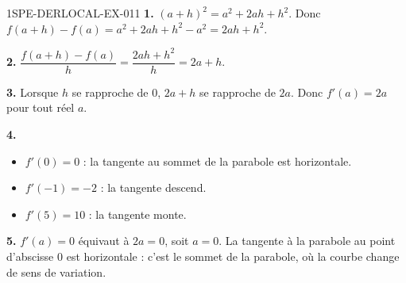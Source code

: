 \begin{corrige}{1SPE-DERLOCAL-EX-011}
\textbf{1.} $(a+h)^2=a^2+2ah+h^2$. Donc $f(a+h)-f(a)=a^2+2ah+h^2-a^2=2ah+h^2$.

\textbf{2.} $\dfrac{f(a+h)-f(a)}{h}=\dfrac{2ah+h^2}{h}=2a+h$.

\textbf{3.} Lorsque $h$ se rapproche de $0$, $2a+h$ se rapproche de $2a$. Donc $f'(a)=2a$ pour tout réel $a$.

\textbf{4.}
\begin{itemize}
  \item $f'(0)=0$ : la tangente au sommet de la parabole est horizontale.
  \item $f'(-1)=-2$ : la tangente descend.
  \item $f'(5)=10$ : la tangente monte.
\end{itemize}

\textbf{5.} $f'(a)=0$ équivaut à $2a=0$, soit $a=0$. La tangente à la parabole au point d'abscisse $0$ est horizontale : c'est le sommet de la parabole, où la courbe change de sens de variation.
\end{corrige}
